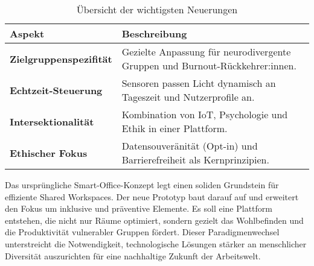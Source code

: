 \begin{table}[htbp]
\centering
\caption{Übersicht der wichtigsten Neuerungen}
\label{tab:delta}
\begin{tabularx}{\textwidth}{lX}
\toprule
\textbf{Aspekt} & \textbf{Beschreibung} \\
\midrule
\textbf{Zielgruppenspezifität} & Gezielte Anpassung für neurodivergente Gruppen und Burnout-Rückkehrer:innen. \\
\midrule
\textbf{Echtzeit-Steuerung} & Sensoren passen Licht dynamisch an Tageszeit und Nutzerprofile an. \\
\midrule
\textbf{Intersektionalität} & Kombination von IoT, Psychologie und Ethik in einer Plattform. \\
\midrule
\textbf{Ethischer Fokus} & Datensouveränität (Opt-in) und Barrierefreiheit als Kernprinzipien. \\
\bottomrule
\end{tabularx}
\end{table}

Das ursprüngliche Smart-Office-Konzept legt einen soliden Grundstein für effiziente Shared Workspaces. Der
neue Prototyp baut darauf auf und erweitert den Fokus um inklusive und präventive Elemente. 
Es soll eine Plattform entstehen, die nicht nur Räume optimiert, sondern gezielt das Wohlbefinden und die 
Produktivität vulnerabler Gruppen fördert. Dieser Paradigmenwechsel unterstreicht die Notwendigkeit, 
technologische Lösungen stärker an menschlicher Diversität auszurichten für eine nachhaltige Zukunft der Arbeitswelt.




